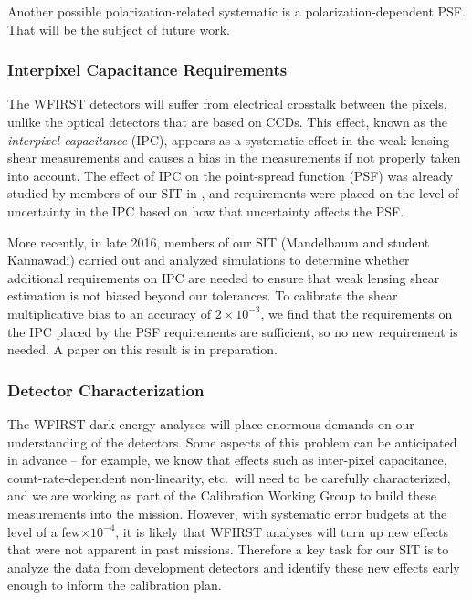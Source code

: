 Another possible polarization-related systematic is a polarization-dependent PSF.  That will be the
subject of future work.

\subsubsection{Interpixel Capacitance Requirements}

The WFIRST detectors will suffer from electrical crosstalk between the pixels, unlike the optical
 detectors that are based on CCDs. This effect, known as the \emph{interpixel capacitance} (IPC),
 appears as a systematic effect in the weak lensing shear measurements and causes a
 bias in the measurements if not properly taken into account. The effect of IPC on the point-spread
 function (PSF) was already studied by members of our SIT in \cite{Kannawadi2016}, and requirements were placed
 on the level of uncertainty in the IPC based on how that uncertainty affects the PSF.

More recently, in late 2016, members of our SIT (Mandelbaum and student Kannawadi) carried out and
analyzed simulations to determine whether additional requirements on IPC are needed to ensure that
weak lensing shear estimation is not biased beyond our tolerances.  To calibrate the shear
multiplicative bias to an accuracy of $2\times 10^{-3}$, we find that the requirements on the IPC
placed by the PSF requirements are sufficient, so no new requirement is needed.  A paper on this
result is in preparation.


\subsubsection{Detector Characterization}

The WFIRST dark energy analyses will place enormous demands on our understanding
of the detectors. Some aspects of this problem can be anticipated in advance --
for example, we know that effects such as inter-pixel capacitance,
count-rate-dependent non-linearity, etc.\ will need to be carefully
characterized, and we are working as part of the Calibration Working Group to
build these measurements into the mission. However, with systematic error
budgets at the level of a few$\times 10^{-4}$, it is likely that WFIRST analyses
will turn up new effects that were not apparent in past missions. Therefore a
key task for our SIT is to analyze the data from development detectors and
identify these new effects early enough to inform the calibration plan.

